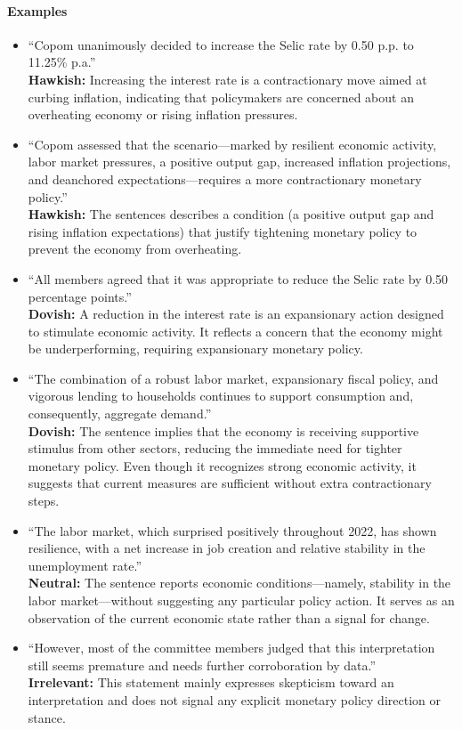 \paragraph{Examples}
\begin{itemize} 
    \item “Copom unanimously decided to increase the Selic rate by 0.50 p.p. to 11.25\% p.a.”
    \\ \textbf{Hawkish:} Increasing the interest rate is a contractionary move aimed at curbing inflation, indicating that policymakers are concerned about an overheating economy or rising inflation pressures. 
    
    \item “Copom assessed that the scenario—marked by resilient economic activity, labor market pressures, a positive output gap, increased inflation projections, and deanchored expectations—requires a more contractionary monetary policy.”
    \\ \textbf{Hawkish:} The sentences describes a condition (a positive output gap and rising inflation expectations) that justify tightening monetary policy to prevent the economy from overheating. 
    
    \item “All members agreed that it was appropriate to reduce the Selic rate by 0.50 percentage points.”
    \\ \textbf{Dovish:} A reduction in the interest rate is an expansionary action designed to stimulate economic activity. It reflects a concern that the economy might be underperforming, requiring expansionary monetary policy. 
    
    \item “The combination of a robust labor market, expansionary fiscal policy, and vigorous lending to households continues to support consumption and, consequently, aggregate demand.”
    \\ \textbf{Dovish:} The sentence implies that the economy is receiving supportive stimulus from other sectors, reducing the immediate need for tighter monetary policy. Even though it recognizes strong economic activity, it suggests that current measures are sufficient without extra contractionary steps. 
    
    \item “The labor market, which surprised positively throughout 2022, has shown resilience, with a net increase in job creation and relative stability in the unemployment rate.”
    \\ \textbf{Neutral:} The sentence reports economic conditions—namely, stability in the labor market—without suggesting any particular policy action. It serves as an observation of the current economic state rather than a signal for change. 

    \item “However, most of the committee members judged that this interpretation still seems premature and needs further corroboration by data.”
    \\ \textbf{Irrelevant:} This statement mainly expresses skepticism toward an interpretation and does not signal any explicit monetary policy direction or stance.
\end{itemize}

